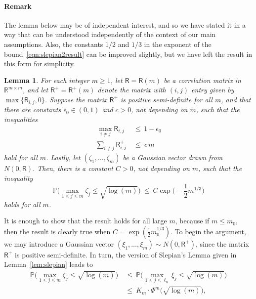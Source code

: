 \documentclass[aos,preprint]{imsart}
\numberwithin{equation}{section}
\theoremstyle{plain}
\newtheorem{lemma}{Lemma}[section]
\newcommand{\R}{\mathbb{R}}
\renewcommand{\P}{\mathbb{P}}
\newcommand{\e}{\epsilon}
\newcommand{\ts}{\textstyle}
\newcommand{\1}{{\bf{1}}}
\newcommand{\0}{\mathbf{0}}
\begin{document}
\paragraph{Remark} The lemma below may be of independent interest, and so we have stated it in a way that can be understood independently of the context of our main assumptions. Also, the constants $1/2$ and $1/3$ in the exponent of the bound~\eqref{eqn:slepian2result} can be improved slightly, but we have left the result in this form for simplicity.

\begin{lemma}\label{lem:slepian2} 
For each integer $m\geq 1$, let $\mathsf{R}=\mathsf{R}(m)$ be a correlation matrix in $\R^{m\times m}$, and let $\mathsf{R}^+=\mathsf{R}^+(m)$ denote the matrix with $(i,j)$ entry given by $\max\{\mathsf{R}_{i,j},0\}$. Suppose the matrix $\mathsf{R}^+$ is positive semi-definite for all $m$, and that there are constants $\e_0\in(0,1)$ and $c>0$, not depending on $m$, such that the inequalities
\begin{align}
\ \max_{i\neq j}\mathsf{R}_{i,j}  & \  \leq \, 1-\e_0\\[0.2cm]
\ts\sum_{i\neq j} \mathsf{R}_{i,j}^+ & \  \leq  \ c\, m\label{eqn:rpluscondn}
\end{align}
hold for all $m$.
Lastly, let $(\zeta_1,\dots,\zeta_m)$ be a Gaussian vector drawn from $N(0,\mathsf{R})$. Then, there is a constant $C>0$, not depending on $m$, such that the inequality
\begin{equation}\label{eqn:slepian2result}
\P\Big(\max_{1\leq j\leq m} \zeta_j\leq \sqrt{\log(m)}\Big) \ \leq \ C\exp\big(-\ts\frac{1}{2}m^{1/3}\big)
\end{equation}
holds for all $m$.
\end{lemma}
\proof It is enough to show that the result holds for all large $m$, because if $m\leq m_0$, then the result is clearly true when $C= \exp(\frac{1}{2}m_0^{1/3})$. To begin the argument,  we may introduce a Gaussian vector $(\xi_1,\dots,\xi_m)\sim N(0,\mathsf{R}^+)$, since the matrix $\mathsf{R}^+$ is positive semi-definite. In turn, the version of Slepian's Lemma given in Lemma~\ref{lem:slepian} leads to
\begin{equation}\label{eqn:splitfactor}
\begin{split}
\P\Big(\max_{1\leq j\leq m}\zeta_j \leq \sqrt{\log(m)}\Big) 
%
& \ \leq \ \P\Big(\max_{1\leq j\leq \ell_n}\xi_j \leq  \sqrt{\log(m)}\Big)\\[0.3cm]
%
 & \ \leq \ K_m\cdot \Phi^{m}\big( \sqrt{\log(m)}\big),
\end{split}
\end{equation}
\end{document}
